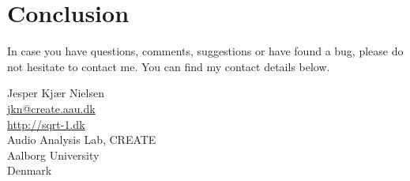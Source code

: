 \section{Conclusion}\label{sec:conclusion}
In case you have questions, comments, suggestions or have found a bug, please do not hesitate to contact me. You can find my contact details below.
  \begin{center}
    Jesper Kjær Nielsen\\
    \href{mailto: jkn@create.aau.dk}{jkn@create.aau.dk}\\
    \href{http://sqrt-1.dk}{http://sqrt-1.dk}\\
    Audio Analysis Lab, CREATE\\
    Aalborg University\\
    Denmark
  \end{center}
